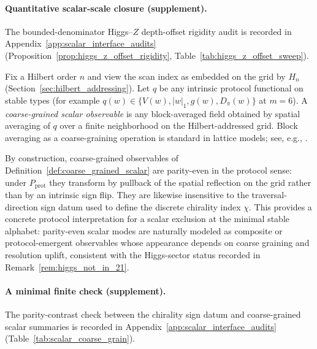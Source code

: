 \paragraph{Quantitative scalar-scale closure (supplement).}
\AuditTag The bounded-denominator Higgs--$Z$ depth-offset rigidity audit is recorded in Appendix~\ref{app:scalar_interface_audits} (Proposition~\ref{prop:higgs_z_offset_rigidity}, Table~\ref{tab:higgs_z_offset_sweep}).

\begin{definition}\label{def:coarse_grained_scalar}
Fix a Hilbert order $n$ and view the scan index as embedded on the grid by $H_n$ (Section~\ref{sec:hilbert_addressing}).
Let $q$ be any intrinsic protocol functional on stable types (for example $q(w)\in\{V(w),|w|_1,g(w),D_\pi(w)\}$ at $m=6$).
A \emph{coarse-grained scalar observable} is any block-averaged field obtained by spatial averaging of $q$ over a finite neighborhood on the Hilbert-addressed grid.
Block averaging as a coarse-graining operation is standard in lattice models; see, e.g., \cite{Wilson1974,Rothe2012}.
\end{definition}

\begin{remark}\label{rem:scalar_emergent_route}
By construction, coarse-grained observables of Definition~\ref{def:coarse_grained_scalar} are parity-even in the protocol sense: under $P_{\mathrm{prot}}$ they transform by pullback of the spatial reflection on the grid rather than by an intrinsic sign flip.
They are likewise insensitive to the traversal-direction sign datum used to define the discrete chirality index $\chi$.
This provides a concrete protocol interpretation for a scalar exclusion at the minimal stable alphabet: parity-even scalar modes are naturally modeled as composite or protocol-emergent observables whose appearance depends on coarse graining and resolution uplift, consistent with the Higgs-sector status recorded in Remark~\ref{rem:higgs_not_in_21}.
\end{remark}

\paragraph{A minimal finite check (supplement).}
\AuditTag The parity-contrast check between the chirality sign datum and coarse-grained scalar summaries is recorded in Appendix~\ref{app:scalar_interface_audits} (Table~\ref{tab:scalar_coarse_grain}).

